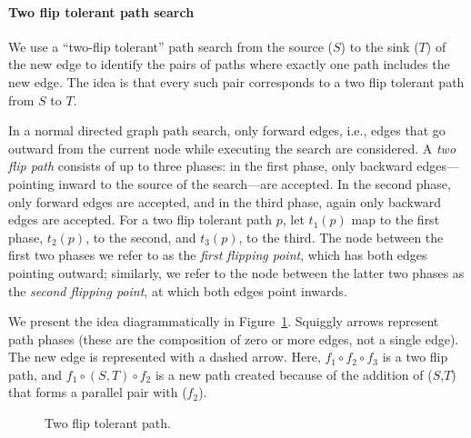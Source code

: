 \documentclass[sigplan,review,anonymous]{acmart}
\begin{document}
\paragraph{Two flip tolerant path search}
We use a ``two-flip tolerant'' path search from the source ($S$) to the sink ($T$) of the new edge to identify the pairs of paths where exactly one path includes the new edge.
The idea is that every such pair corresponds to a two flip tolerant path from $S$ to $T$.

In a normal directed graph path search, only forward edges, i.e., edges that go outward from the current node while executing the search are considered.
A \textit{two flip path} consists of up to three phases: in the first phase, only backward edges---pointing inward to the source of the search---are accepted.
In the second phase, only forward edges are accepted, and in the third phase, again only backward edges are accepted.
For a two flip tolerant path $p$, let $t_1(p)$ map to the first phase, $t_2(p)$, to the second, and $t_3(p)$, to the third.
The node between the first two phases we refer to as the \textit{first flipping point}, which has both edges pointing outward; similarly, we refer to the node between the latter two phases as the \textit{second flipping point}, at which both edges point inwards.

We present the idea diagrammatically in Figure~\ref{figure_two_flip}.
Squiggly arrows represent path phases (these are the composition of zero or more edges, not a single edge).
The new edge is represented with a dashed arrow.
Here, $f_1 \circ f_2 \circ f_3$ is a two flip path, and $f_1 \circ (S, T) \circ f_2$  is a new path created because of the addition of ($S$,$T$) that forms a parallel pair with ($f_2$).

\begin{figure}
\begin{center}
\end{center}
\caption{Two flip tolerant path.}
\label{figure_two_flip}
\end{figure}
\end{document}
